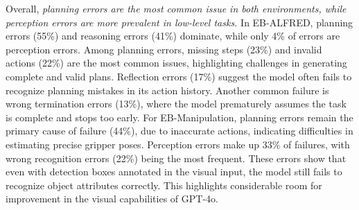 Overall, \emph{planning errors are the most common issue in both environments, while perception errors are more prevalent in low-level tasks.}
In EB-ALFRED, planning errors (55\%) and reasoning errors (41\%) dominate, while only 4\% of errors are perception errors. Among planning errors, missing steps (23\%) and invalid actions (22\%) are the most common issues, highlighting challenges in generating complete and valid plans. Reflection errors (17\%) suggest the model often fails to recognize planning mistakes in its action history. Another common failure is wrong termination errors (13\%), where the model prematurely assumes the task is complete and stops too early. For EB-Manipulation, planning errors remain the primary cause of failure (44\%), due to inaccurate actions, indicating difficulties in estimating precise gripper poses. Perception errors make up 33\% of failures, with wrong recognition errors (22\%) being the most frequent. These errors show that even with detection boxes annotated in the visual input, the model still fails to recognize object attributes correctly.  This highlights considerable room for improvement in the visual capabilities of GPT-4o.



